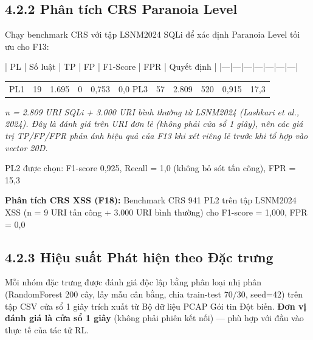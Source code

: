 \documentclass[12pt,a4paper,twoside]{report}
\begin{document}
{{\subsection{4.2.2 Phân tích CRS Paranoia Level}

Chạy benchmark CRS với tập LSNM2024 SQLi để xác định Paranoia Level tối ưu cho F13:

| PL | Số luật | TP | FP | F1-Score | FPR | Quyết định |
|---|---|---|---|---|---|---|


\begin{tabular}{p{2.5cm}p{2.5cm}p{2.5cm}p{2.5cm}p{2.5cm}p{2.5cm}p{2.5cm}}
\hline
PL1 & 19 & 1.695 & 0 & 0,753 & 0,0%
\hline
PL3 & 57 & 2.809 & 520 & 0,915 & 17,3%
\hline
\end{tabular}

\textit{n = 2.809 URI SQLi + 3.000 URI bình thường từ LSNM2024 (Lashkari et al., 2024). Đây là đánh giá trên URI đơn lẻ (không phải cửa sổ 1 giây), nên các giá trị TP/FP/FPR phản ánh hiệu quả của F13 khi xét riêng lẻ trước khi tổ hợp vào vector 20D.}

PL2 được chọn: F1-score 0,925, Recall = 1,0 (không bỏ sót tấn công), FPR = 15,3%

\textbf{Phân tích CRS XSS (F18):} Benchmark CRS 941 PL2 trên tập LSNM2024 XSS (n = 9 URI tấn công + 3.000 URI bình thường) cho F1-score = 1,000, FPR = 0,0%

\subsection{4.2.3 Hiệu suất Phát hiện theo Đặc trưng}

Mỗi nhóm đặc trưng được đánh giá độc lập bằng phân loại nhị phân (RandomForest 200 cây, lấy mẫu cân bằng, chia train-test 70/30, seed=42) trên tập CSV cửa sổ 1 giây trích xuất từ Bộ dữ liệu PCAP Gói tin Đột biến. \textbf{Đơn vị đánh giá là cửa sổ 1 giây} (không phải phiên kết nối) — phù hợp với đầu vào thực tế của tác tử RL.

}}
\end{document}
